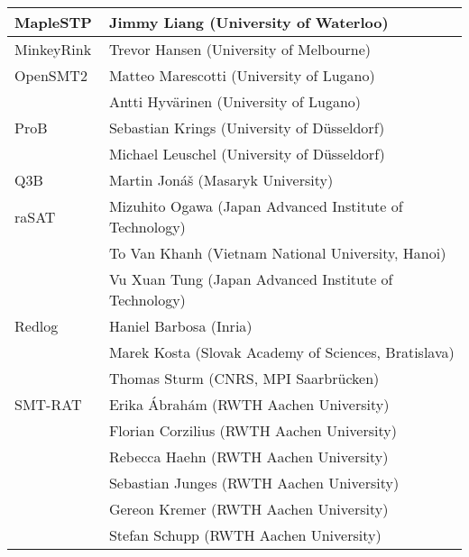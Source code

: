 {\begin{table}
\begin{tabular}{ll}
      MapleSTP
      & Jimmy Liang (University of Waterloo)
      \\ \midrule

      MinkeyRink
      & Trevor Hansen (University of Melbourne)
      \\ \midrule

      OpenSMT2~\cite{DBLP:conf/sat/HyvarinenMAS16}
      & Matteo Marescotti (University of Lugano) \\
      & Antti Hyv\"arinen (University of Lugano)
      \\ \midrule

      ProB~\cite{doi:10.1002/9781119002727.ch14}
      & Sebastian Krings (University of D\"usseldorf) \\
      & Michael Leuschel (University of D\"usseldorf)
      \\ \midrule

      Q3B
      & Martin Jon\'a\v{s} (Masaryk University)
      \\ \midrule

      raSAT~\cite{rasat}
      & Mizuhito Ogawa (Japan Advanced Institute of Technology) \\
      & To Van Khanh (Vietnam National University, Hanoi) \\
      & Vu Xuan Tung (Japan Advanced Institute of Technology)
      \\ \midrule

      Redlog~\cite{DBLP:journals/cca/Dolzmann097}
      & Haniel Barbosa (Inria) \\
      & Marek Kosta (Slovak Academy of Sciences, Bratislava)  \\
      & Thomas Sturm (CNRS, MPI Saarbr\"ucken)
      \\ \midrule

      SMT-RAT~\cite{DBLP:conf/sat/CorziliusKJSA15}
      & Erika \'Abrah\'am (RWTH Aachen University) \\
      & Florian Corzilius (RWTH Aachen University) \\
      & Rebecca Haehn (RWTH Aachen University) \\
      & Sebastian Junges (RWTH Aachen University) \\
      & Gereon Kremer (RWTH Aachen University) \\
      & Stefan Schupp (RWTH Aachen University)
      \\ \bottomrule
    \end{tabular}
  \end{table}

}

